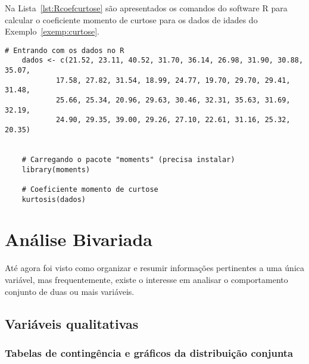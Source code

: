 \documentclass[11pt,fleqn]{book} %
\begin{document}
\vspace{0,3cm}


Na Lista~\ref{lst:Rcoefcurtose} são apresentados os comandos do software R para calcular o coeficiente momento de curtose para os dados de idades do Exemplo~\ref{exemp:curtose}. \\

\begin{scriptsize}
	\estiloR
	\begin{lstlisting}[caption={Comandos do software R}, label=lst:Rcoefcurtose]
	# Entrando com os dados no R
	dados <- c(21.52, 23.11, 40.52, 31.70, 36.14, 26.98, 31.90, 30.88, 35.07,
			17.58, 27.82, 31.54, 18.99, 24.77, 19.70, 29.70, 29.41, 31.48,
			25.66, 25.34, 20.96, 29.63, 30.46, 32.31, 35.63, 31.69, 32.19,
			24.90, 29.35, 39.00, 29.26, 27.10, 22.61, 31.16, 25.32, 20.35)


	# Carregando o pacote "moments" (precisa instalar)
	library(moments)
	
	# Coeficiente momento de curtose
	kurtosis(dados)

	\end{lstlisting}
\end{scriptsize}





\chapter{Análise Bivariada}

Até agora foi visto como organizar e resumir informações pertinentes a uma única variável, mas frequentemente, existe o interesse em analisar o comportamento conjunto de duas ou mais variáveis.


\section{Variáveis qualitativas}

\subsection{Tabelas de contingência e gráficos da distribuição conjunta}
\end{document}
